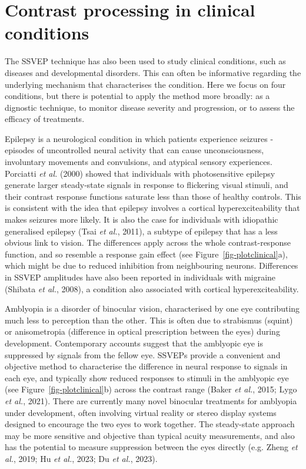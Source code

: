 \documentclass[
  letterpaper,
  DIV=11,
  numbers=noendperiod]{scrartcl}
\begin{document}
\section{Contrast processing in clinical
conditions}\label{contrast-processing-in-clinical-conditions}

The SSVEP technique has also been used to study clinical conditions,
such as diseases and developmental disorders. This can often be
informative regarding the underlying mechanism that characterises the
condition. Here we focus on four conditions, but there is potential to
apply the method more broadly: as a dignostic technique, to monitor
disease severity and progression, or to assess the efficacy of
treatments.

Epilepsy is a neurological condition in which patients experience
seizures - episodes of uncontrolled neural activity that can cause
unconsciousness, involuntary movements and convulsions, and atypical
sensory experiences. Porciatti \emph{et al.} (2000) showed that
individuals with photosensitive epilepsy generate larger steady-state
signals in response to flickering visual stimuli, and their contrast
response functions saturate less than those of healthy controls. This is
consistent with the idea that epilepsy involves a cortical
hyperexciteability that makes seizures more likely. It is also the case
for individuals with idiopathic generalised epilepsy (Tsai \emph{et
al.}, 2011), a subtype of epilepsy that has a less obvious link to
vision. The differences apply across the whole contrast-response
function, and so resemble a response gain effect (see
Figure~\ref{fig-plotclinical}a), which might be due to reduced
inhibition from neighbouring neurons. Differences in SSVEP amplitudes
have also been reported in individuals with migraine (Shibata \emph{et
al.}, 2008), a condition also associated with cortical
hyperexciteability.

Amblyopia is a disorder of binocular vision, characterised by one eye
contributing much less to perception than the other. This is often due
to strabismus (squint) or anisometropia (difference in optical
prescription between the eyes) during development. Contemporary accounts
suggest that the amblyopic eye is suppressed by signals from the fellow
eye. SSVEPs provide a convenient and objective method to characterise
the difference in neural response to signals in each eye, and typically
show reduced responses to stimuli in the amblyopic eye (see
Figure~\ref{fig-plotclinical}b) across the contrast range (Baker
\emph{et al.}, 2015; Lygo \emph{et al.}, 2021). There are currently many
novel binocular treatments for amblyopia under development, often
involving virtual reality or stereo display systems designed to
encourage the two eyes to work together. The steady-state approach may
be more sensitive and objective than typical acuity measurements, and
also has the potential to measure suppression between the eyes directly
(e.g. Zheng \emph{et al.}, 2019; Hu \emph{et al.}, 2023; Du \emph{et
al.}, 2023).
\end{document}
